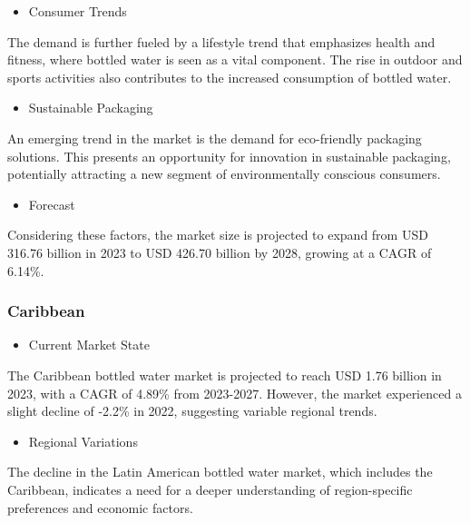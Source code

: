\documentclass{article}
\begin{document}
\begin{itemize}
    \item Consumer Trends
\end{itemize}

The demand is further fueled by a lifestyle trend that emphasizes health and fitness, where bottled water is seen as a vital component. The rise in outdoor and sports activities also contributes to the increased consumption of bottled water.\par

\begin{itemize}
    \item Sustainable Packaging
\end{itemize}
An emerging trend in the market is the demand for eco-friendly packaging solutions. This presents an opportunity for innovation in sustainable packaging, potentially attracting a new segment of environmentally conscious consumers.\par

\begin{itemize}
    \item Forecast
\end{itemize}
Considering these factors, the market size is projected to expand from USD 316.76 billion in 2023 to USD 426.70 billion by 2028, growing at a CAGR of 6.14\%.\par

\subsubsection{Caribbean}\par
\begin{itemize}
    \item Current Market State
\end{itemize}

The Caribbean bottled water market is projected to reach USD 1.76 billion in 2023, with a CAGR of 4.89\% from 2023-2027. However, the market experienced a slight decline of -2.2\% in 2022, suggesting variable regional trends.\par

\begin{itemize}
    \item Regional Variations
\end{itemize}
The decline in the Latin American bottled water market, which includes the Caribbean, indicates a need for a deeper understanding of region-specific preferences and economic factors.\par
\end{document}
